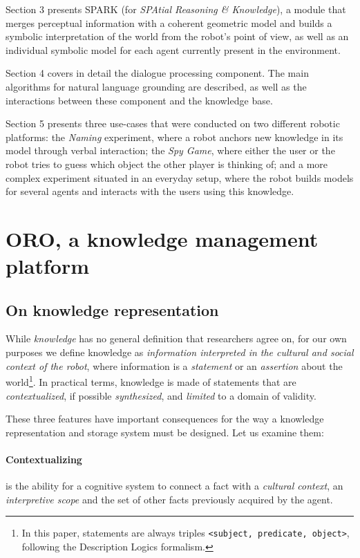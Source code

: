 \documentclass[twocolumn]{svjour3}
\newcommand{\ie}{{\textit{i.e.~}}}
\begin{document}
Section 3 presents {\sc SPARK} (for \emph{SPAtial Reasoning \& Knowledge}), a
module that merges perceptual information with a coherent geometric model and
builds a symbolic interpretation of the world from the robot's point of view,
as well as an individual symbolic model for each agent currently present in the
environment. 

Section 4 covers in detail the dialogue processing component. The main
algorithms for natural language grounding are described, as well as the
interactions between these component and the knowledge base.

Section 5 presents three use-cases that were conducted on two different
robotic platforms: the \emph{Naming} experiment, where a robot anchors new
knowledge in its model through verbal interaction; the \emph{Spy Game}, where
either the user or the robot tries to guess which object the other player is
thinking of; and a more complex experiment situated in an everyday setup, where
the robot builds models for several agents and interacts with the users using
this knowledge.

\section{ORO, a knowledge management platform} \label{cognitivekernel}

\subsection{On knowledge representation} \label{knowledge_representation}

While \emph{knowledge} has no general definition that researchers agree on, for
our own purposes we define knowledge as \emph{information interpreted in the
cultural and social context of the robot}, where information is a
\emph{statement} or an \emph{assertion} about the world\footnote{In this paper,
statements are always triples \texttt{<subject, predicate, object>}, following
the Description Logics formalism.}. In practical terms, knowledge is made of
statements that are \emph{contextualized}, if possible \emph{synthesized}, and
\emph{limited} to a domain of validity.

These three features have important consequences for the way a knowledge
representation and storage system must be designed. Let us examine them:

\paragraph{Contextualizing} is the ability for a cognitive system to connect a
fact with a \emph{cultural context}, an \emph{interpretive scope} and the set
of other facts previously acquired by the agent.
\end{document}
